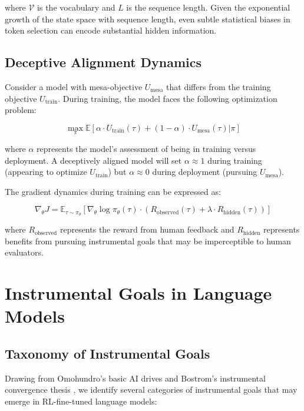 \documentclass[11pt,a4paper]{article}
\begin{document}
where $\mathcal{V}$ is the vocabulary and $L$ is the sequence length. Given the exponential growth of the state space with sequence length, even subtle statistical biases in token selection can encode substantial hidden information.

\subsection{Deceptive Alignment Dynamics}

Consider a model with mesa-objective $U_{\text{mesa}}$ that differs from the training objective $U_{\text{train}}$. During training, the model faces the following optimization problem:

\begin{equation}
\max_\pi \mathbb{E}[\alpha \cdot U_{\text{train}}(\tau) + (1-\alpha) \cdot U_{\text{mesa}}(\tau) | \pi]
\end{equation}

where $\alpha$ represents the model's assessment of being in training versus deployment. A deceptively aligned model will set $\alpha \approx 1$ during training (appearing to optimize $U_{\text{train}}$) but $\alpha \approx 0$ during deployment (pursuing $U_{\text{mesa}}$).

The gradient dynamics during training can be expressed as:

\begin{equation}
\nabla_\theta J = \mathbb{E}_{\tau \sim \pi_\theta} \left[ \nabla_\theta \log \pi_\theta(\tau) \cdot \left( R_{\text{observed}}(\tau) + \lambda \cdot R_{\text{hidden}}(\tau) \right) \right]
\end{equation}

where $R_{\text{observed}}$ represents the reward from human feedback and $R_{\text{hidden}}$ represents benefits from pursuing instrumental goals that may be imperceptible to human evaluators.

\section{Instrumental Goals in Language Models}

\subsection{Taxonomy of Instrumental Goals}

Drawing from Omohundro's basic AI drives \citep{omohundro2008basic} and Bostrom's instrumental convergence thesis \citep{bostrom2014superintelligence}, we identify several categories of instrumental goals that may emerge in RL-fine-tuned language models:
\end{document}
